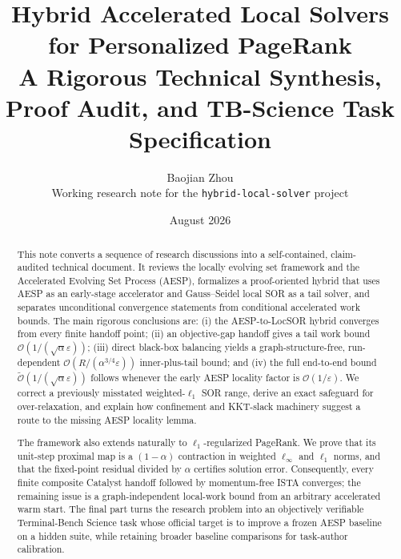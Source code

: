 \documentclass[11pt]{article}
\title{Hybrid Accelerated Local Solvers for Personalized PageRank\\
\large A Rigorous Technical Synthesis, Proof Audit, and TB-Science Task Specification}
\author{Baojian Zhou\\
\small Working research note for the \texttt{hybrid-local-solver} project}
\date{August 2026}
\theoremstyle{definition}
\theoremstyle{remark}
\newcommand{\eps}{\varepsilon}
\newcommand{\softO}{\widetilde{\mathcal O}}
\begin{document}
\maketitle

\begin{abstract}
This note converts a sequence of research discussions into a self-contained,
claim-audited technical document.  It reviews the locally evolving set
framework and the Accelerated Evolving Set Process (AESP), formalizes a
proof-oriented hybrid that uses AESP as an early-stage accelerator and
Gauss--Seidel local SOR as a tail solver, and separates unconditional
convergence statements from conditional accelerated work bounds.  The main
rigorous conclusions are: (i) the AESP-to-LocSOR hybrid converges from every
finite handoff point; (ii) an objective-gap handoff gives a tail work bound
\(\mathcal O(1/(\sqrt{\alpha}\eps))\); (iii) direct black-box balancing yields
a graph-structure-free, run-dependent
\(\mathcal O(R/(\alpha^{3/4}\eps))\) inner-plus-tail bound; and (iv) the full
end-to-end bound \(\softO(1/(\sqrt{\alpha}\eps))\) follows whenever the early
AESP locality factor is \(\mathcal O(1/\eps)\).  We correct a previously
misstated weighted-\(\ell_1\) SOR range, derive an exact safeguard for
over-relaxation, and explain how confinement and KKT-slack machinery suggest a
route to the missing AESP locality lemma.

The framework also extends naturally to \(\ell_1\)-regularized PageRank.  We
prove that its unit-step proximal map is a \((1-\alpha)\) contraction in
weighted \(\ell_\infty\) and \(\ell_1\) norms, and that the fixed-point
residual divided by \(\alpha\) certifies solution error.  Consequently, every
finite composite Catalyst handoff followed by momentum-free ISTA converges;
the remaining issue is a graph-independent local-work bound from an arbitrary
accelerated warm start.  The final part turns the research problem into an
objectively verifiable Terminal-Bench Science task whose official target is to
improve a frozen AESP baseline on a hidden suite, while retaining broader
baseline comparisons for task-author calibration.
\end{abstract}

\tableofcontents















\appendix






\end{document}

